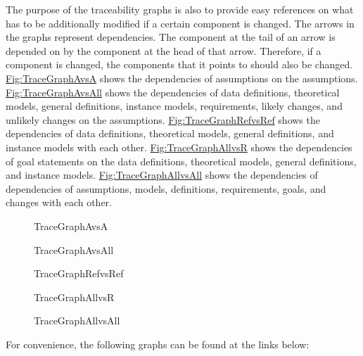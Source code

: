 \documentclass[12pt]{article}
\begin{document}
The purpose of the traceability graphs is also to provide easy references on what has to be additionally modified if a certain component is changed. The arrows in the graphs represent dependencies. The component at the tail of an arrow is depended on by the component at the head of that arrow. Therefore, if a component is changed, the components that it points to should also be changed. \hyperref[Figure:TraceGraphAvsA]{Fig:TraceGraphAvsA} shows the dependencies of assumptions on the assumptions. \hyperref[Figure:TraceGraphAvsAll]{Fig:TraceGraphAvsAll} shows the dependencies of data definitions, theoretical models, general definitions, instance models, requirements, likely changes, and unlikely changes on the assumptions. \hyperref[Figure:TraceGraphRefvsRef]{Fig:TraceGraphRefvsRef} shows the dependencies of data definitions, theoretical models, general definitions, and instance models with each other. \hyperref[Figure:TraceGraphAllvsR]{Fig:TraceGraphAllvsR} shows the dependencies of goal statements on the data definitions, theoretical models, general definitions, and instance models. \hyperref[Figure:TraceGraphAllvsAll]{Fig:TraceGraphAllvsAll} shows the dependencies of dependencies of assumptions, models, definitions, requirements, goals, and changes with each other.

\begin{figure}
\begin{center}

\caption{TraceGraphAvsA}
\label{Figure:TraceGraphAvsA}
\end{center}
\end{figure}
\begin{figure}
\begin{center}

\caption{TraceGraphAvsAll}
\label{Figure:TraceGraphAvsAll}
\end{center}
\end{figure}
\begin{figure}
\begin{center}

\caption{TraceGraphRefvsRef}
\label{Figure:TraceGraphRefvsRef}
\end{center}
\end{figure}
\begin{figure}
\begin{center}

\caption{TraceGraphAllvsR}
\label{Figure:TraceGraphAllvsR}
\end{center}
\end{figure}
\begin{figure}
\begin{center}

\caption{TraceGraphAllvsAll}
\label{Figure:TraceGraphAllvsAll}
\end{center}
\end{figure}
For convenience, the following graphs can be found at the links below:
\end{document}
